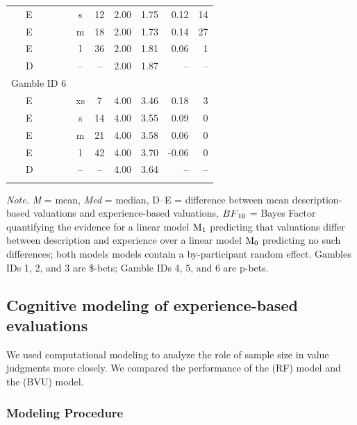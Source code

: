 \documentclass[a4paper, man, floatsintext]{apa6}
\begin{document}
\begin{table}[tbp]
\begin{center}
\begin{threeparttable}
\begin{tabular}{lccccrr}
\ \ \ E & s & 12 & 2.00 & 1.75 & 0.12 & 14\\
\ \ \ E & m & 18 & 2.00 & 1.73 & 0.14 & 27\\
\ \ \ E & l & 36 & 2.00 & 1.81 & 0.06 & 1\\
\ \ \ D & -- & -- & 2.00 & 1.87 & -- & --\\
Gamble ID 6 &  &  &  &  &  & \\
\ \ \ E & xs & 7 & 4.00 & 3.46 & 0.18 & 3\\
\ \ \ E & s & 14 & 4.00 & 3.55 & 0.09 & 0\\
\ \ \ E & m & 21 & 4.00 & 3.58 & 0.06 & 0\\
\ \ \ E & l & 42 & 4.00 & 3.70 & -0.06 & 0\\
\ \ \ D & -- & -- & 4.00 & 3.64 & -- & --\\
\bottomrule
\addlinespace
\end{tabular}
\begin{tablenotes}[para]
\normalsize{\textit{Note.} \textit{M} = mean, \textit{Med} = median, D--E = difference between mean description-based valuations and experience-based valuations, $BF\textsubscript{10}$ = Bayes Factor quantifying the evidence for a linear model $\mathrm{M}\textsubscript{1}$ predicting that valuations differ between description and experience over a linear model $\mathrm{M}\textsubscript{0}$ predicting no such differences; both models models contain a by-participant random effect. Gambles IDs 1, 2, and 3 are \$-bets; Gamble IDs 4, 5, and 6 are p-bets.}
\end{tablenotes}
\end{threeparttable}
\end{center}
\end{table}

\subsection{Cognitive modeling of experience-based evaluations}

We used computational modeling to analyze the role of sample size in
value judgments more closely. We compared the performance of the
 (RF) model and the
 (BVU) model.

\subsubsection{Modeling Procedure}
\end{document}
